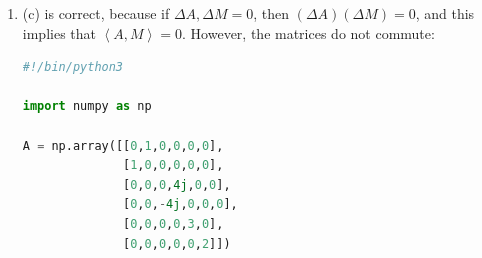 \documentclass[11pt, letterpaper]{article}
\begin{document}
\begin{enumerate}
\begin{lstlisting}[language=Python]
import numpy as np

A = np.array([[0,1,0,0,0,0],
              [1,0,0,0,0,0],
              [0,0,0,4j,0,0],
              [0,0,-4j,0,0,0],
              [0,0,0,0,3,0],
              [0,0,0,0,0,2]])

Asq = A @ A 

psi = (1/np.sqrt(6)) * np.ones((6, 1), dtype=complex)

EV_A = psi.conj().T @ A @ psi
EV_Asq = psi.conj().T @ Asq @ psi 

stdev = np.sqrt(EV_Asq - EV_A)

print(stdev)
\end{lstlisting}
	Output:
	\begin{lstlisting}
		[[2.5819889+0.j]]
\end{lstlisting}
	Therefore, $\Delta A \approx 2.5819889$. Here is the calculation of $\left| \left\langle \left[ A,M \right]  \right\rangle  \right| $:
	\begin{lstlisting}[language=Python]	
#!/bin/python3

import numpy as np

A = np.array([[0,1,0,0,0,0],
              [1,0,0,0,0,0],
              [0,0,0,4j,0,0],
              [0,0,-4j,0,0,0],
              [0,0,0,0,3,0],
              [0,0,0,0,0,2]])

M = np.array([[5,0,0,0,0,0],
              [0,0,3,0,0,0],
              [0,3,0,0,0,0],
              [0,0,0,0,2j,0],
              [0,0,0,-2j,0,0],
              [0,0,0,0,0,7]])

psi = (1/np.sqrt(6)) * np.ones((6, 1), dtype=complex)
comm = (A @ M) - (M @ A)
EV = psi.conj().T @ comm @ psi

print(np.abs(EV))
\end{lstlisting}
	Output:
	\begin{lstlisting}
		[[6.]]
\end{lstlisting}
	The uncertainty principle states
	\[
		(\Delta A)(\Delta M)\geq \frac{1}{2} \left| \left\langle \left[ A,M \right]  \right\rangle  \right| 
	.\]
	Note that $3$ is clearly less than the product $3.7\cdot 2.6$.
	\item (c) is correct, because if $\Delta A,\Delta M=0$, then $(\Delta A)(\Delta M)=0$, and this implies that $\left\langle A,M \right\rangle =0$. However, the matrices do not commute:
		\begin{lstlisting}[language=Python]		
#!/bin/python3

import numpy as np

A = np.array([[0,1,0,0,0,0],
              [1,0,0,0,0,0],
              [0,0,0,4j,0,0],
              [0,0,-4j,0,0,0],
              [0,0,0,0,3,0],
              [0,0,0,0,0,2]])


\end{lstlisting}
\end{enumerate}
\end{document}
